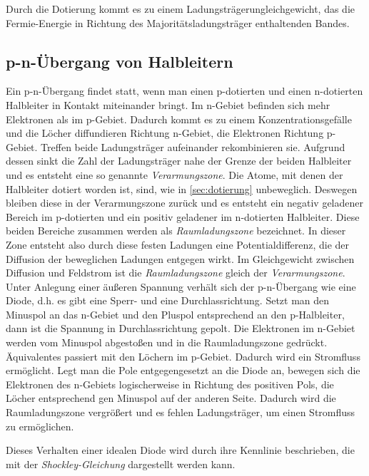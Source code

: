 \documentclass[slug=SZ, room=Hermann-Krone-Bau\,\ Labor\ 1.25,
supervisor=Martin\ Kroll, coursedate=14.\ 11.\ 2019]{../../Lab_Report_LaTeX/lab_report}
\begin{document}
Durch die Dotierung kommt es zu einem Ladungsträgerungleichgewicht, das die Fermie-Energie in Richtung des
Majoritätsladungsträger enthaltenden Bandes.

\subsection{p-n-Übergang von Halbleitern}
\label{sec:pnüber}

Ein p-n-Übergang findet statt, wenn man einen p-dotierten und einen n-dotierten Halbleiter in Kontakt miteinander
bringt. Im n-Gebiet befinden sich mehr Elektronen als im p-Gebiet. Dadurch kommt es zu einem Konzentrationsgefälle
und die Löcher diffundieren Richtung n-Gebiet, die Elektronen Richtung p-Gebiet. Treffen beide Ladungsträger
aufeinander rekombinieren sie. Aufgrund dessen sinkt die Zahl der Ladungsträger nahe der Grenze der beiden
Halbleiter und es entsteht eine so genannte \emph{Verarmungszone}. Die Atome, mit denen der Halbleiter
dotiert worden ist, sind, wie in \ref{sec:dotierung} unbeweglich. Deswegen bleiben diese in der Verarmungszone
zurück und es entsteht ein negativ geladener Bereich im p-dotierten und ein positiv geladener im
n-dotierten Halbleiter. Diese beiden Bereiche zusammen werden als \emph{Raumladungszone} bezeichnet.
In dieser Zone entsteht also durch diese festen Ladungen eine Potentialdifferenz, die der Diffusion der
beweglichen Ladungen entgegen wirkt. Im Gleichgewicht zwischen Diffusion und Feldstrom ist die
\emph{Raumladungszone} gleich der \emph{Verarmungszone}.\\

Unter Anlegung einer äußeren Spannung verhält sich der p-n-Übergang wie eine Diode, d.h. es gibt eine Sperr-
und eine Durchlassrichtung.
Setzt man den Minuspol an das n-Gebiet und den Pluspol entsprechend an den p-Halbleiter, dann ist die Spannung
in Durchlassrichtung gepolt. Die Elektronen im n-Gebiet werden vom Minuspol abgestoßen und in die Raumladungszone
gedrückt. Äquivalentes passiert mit den Löchern im p-Gebiet. Dadurch wird ein Stromfluss ermöglicht.
Legt man die Pole entgegengesetzt an die Diode an, bewegen sich die Elektronen des n-Gebiets logischerweise in
Richtung des positiven Pols, die Löcher entsprechend gen Minuspol auf der anderen Seite. Dadurch wird die
Raumladungszone vergrößert und es fehlen Ladungsträger, um einen Stromfluss zu ermöglichen.

Dieses Verhalten einer idealen Diode wird durch ihre Kennlinie beschrieben, die mit der \emph{Shockley-Gleichung}
dargestellt werden kann.
\end{document}
